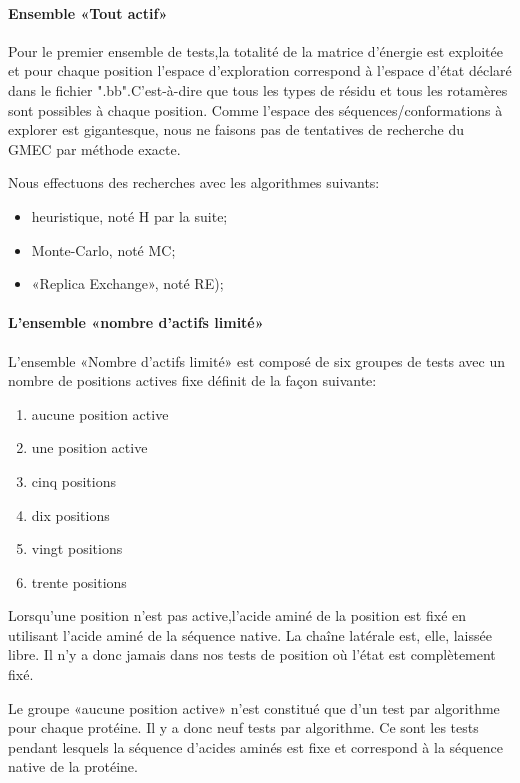 \paragraph{Ensemble «Tout actif»}
\label{methode_TTactif}
Pour le premier ensemble de tests,la totalité de la matrice d'énergie est exploitée et pour chaque position l'espace d'exploration correspond à l'espace d'état déclaré dans le fichier ".bb".C'est-à-dire que tous les types de résidu et tous les rotamères sont possibles à chaque position.
Comme l'espace des séquences/conformations à explorer est gigantesque, nous ne faisons pas de tentatives de recherche du GMEC  par méthode exacte. 

Nous effectuons des recherches avec les algorithmes suivants:

\begin{itemize}
\item heuristique, noté H par la suite;
\item Monte-Carlo, noté MC;
\item «Replica Exchange», noté RE);
\end{itemize}


\paragraph{L'ensemble «nombre d'actifs limité»}

L'ensemble «Nombre d'actifs limité» est composé de six groupes de tests avec un nombre de positions actives fixe définit de la façon suivante:  


\begin{enumerate}
\item aucune position active
\item une position active 
\item cinq positions 
\item dix  positions 
\item vingt positions 
\item trente positions 
\end{enumerate}

Lorsqu'une position n'est pas active,l'acide aminé de la position est fixé en utilisant l'acide aminé de la séquence native. La chaîne latérale est, elle, laissée libre. Il n'y a donc jamais dans nos tests de position où l'état est complètement fixé.

Le groupe «aucune position active» n'est constitué que d'un test par algorithme pour chaque protéine. Il y a donc neuf tests par algorithme.
Ce sont les tests pendant lesquels la séquence d'acides aminés est fixe et correspond à la séquence native de la protéine.

